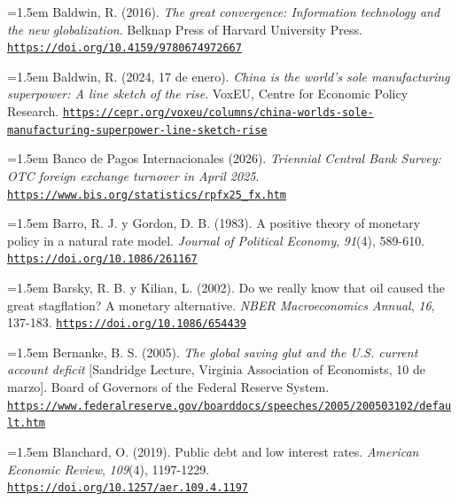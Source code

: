 \documentclass[10pt,a4paper]{article}
\begin{document}
{\sloppy\noindent\hangindent=1.5em Baldwin, R. (2016). \textit{The great convergence: Information technology and the new globalization}. Belknap Press of Harvard University Press. \href{https://doi.org/10.4159/9780674972667}{\nolinkurl{https://doi.org/10.4159/9780674972667}}\par}

{\sloppy\noindent\hangindent=1.5em Baldwin, R. (2024, 17 de enero). \textit{China is the world's sole manufacturing superpower: A line sketch of the rise}. VoxEU, Centre for Economic Policy Research. \href{https://cepr.org/voxeu/columns/china-worlds-sole-manufacturing-superpower-line-sketch-rise}{\nolinkurl{https://cepr.org/voxeu/columns/china-worlds-sole-manufacturing-superpower-line-sketch-rise}}\par}

{\sloppy\noindent\hangindent=1.5em Banco de Pagos Internacionales (2026). \textit{Triennial Central Bank Survey: OTC foreign exchange turnover in April 2025}. \href{https://www.bis.org/statistics/rpfx25_fx.htm}{\nolinkurl{https://www.bis.org/statistics/rpfx25_fx.htm}}\par}

{\sloppy\noindent\hangindent=1.5em Barro, R. J. y Gordon, D. B. (1983). A positive theory of monetary policy in a natural rate model. \textit{Journal of Political Economy}, \textit{91}(4), 589-610. \href{https://doi.org/10.1086/261167}{\nolinkurl{https://doi.org/10.1086/261167}}\par}

{\sloppy\noindent\hangindent=1.5em Barsky, R. B. y Kilian, L. (2002). Do we really know that oil caused the great stagflation? A monetary alternative. \textit{NBER Macroeconomics Annual}, \textit{16}, 137-183. \href{https://doi.org/10.1086/654439}{\nolinkurl{https://doi.org/10.1086/654439}}\par}

{\sloppy\noindent\hangindent=1.5em Bernanke, B. S. (2005). \textit{The global saving glut and the U.S. current account deficit} [Sandridge Lecture, Virginia Association of Economists, 10 de marzo]. Board of Governors of the Federal Reserve System. \href{https://www.federalreserve.gov/boarddocs/speeches/2005/200503102/default.htm}{\nolinkurl{https://www.federalreserve.gov/boarddocs/speeches/2005/200503102/default.htm}}\par}

{\sloppy\noindent\hangindent=1.5em Blanchard, O. (2019). Public debt and low interest rates. \textit{American Economic Review}, \textit{109}(4), 1197-1229. \href{https://doi.org/10.1257/aer.109.4.1197}{\nolinkurl{https://doi.org/10.1257/aer.109.4.1197}}\par}
\end{document}
